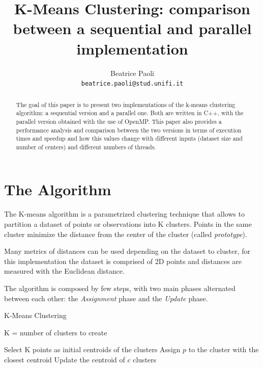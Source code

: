 \documentclass[10pt,twocolumn,letterpaper]{article}
\begin{document}
\title{K-Means Clustering: comparison between a sequential and parallel implementation}

\author{Beatrice Paoli\\
{\tt\small beatrice.paoli@stud.unifi.it}
}

\maketitle
\thispagestyle{empty}

\begin{abstract}
	The goal of this paper is to present two implementations of the k-means clustering algorithm: a sequential version and a parallel one. Both are written in C++, with the parallel version obtained with the use of OpenMP. This paper also provides a performance analysis and comparison between the two versions in terms of execution times and speedup and how this values change with different inputs (dataset size and number of centers) and different numbers of threads. 
\end{abstract}


\section{The Algorithm}

The K-means algorithm is a parametrized clustering technique that allows to partition a dataset of points or observations into K clusters. Points in the same cluster minimize the distance from the center of the cluster (called \textit{prototype}). 

Many metrics of distances can be used depending on the dataset to cluster, for this implementation the dataset is comprised of 2D points and distances are measured with the Euclidean distance.

The algorithm is composed by few steps, with two main phases alternated between each other: the \textit{Assignment} phase and the \textit{Update} phase. %

\begin{algorithm}
	\label{alg:KMeansAlg}
	\caption{K-Means Clustering}
	\begin{algorithmic}
		\Require K = number of clusters to create
		\vspace{0.5cm}
		
		\State Select K points as initial centroids of the clusters
		\State Assign $p$ to the cluster with the closest centroid
		\EndFor
		\State Update the centroid of $c$
		\EndFor
		\EndWhile
		\State \Return clusters
		
	\end{algorithmic}
\end{algorithm}
\end{document}
